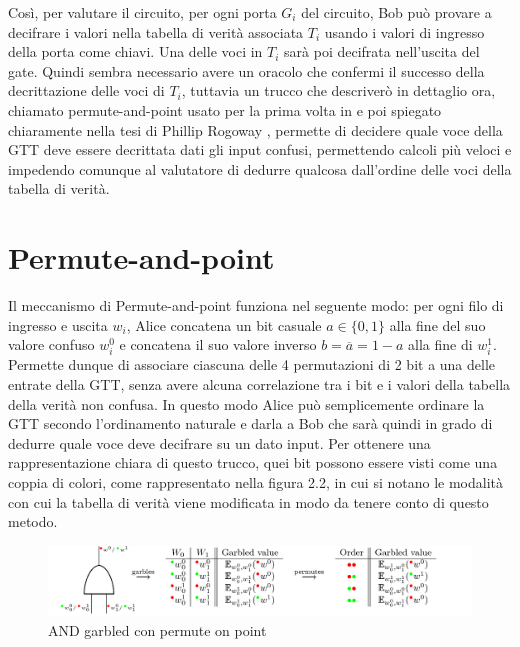 \documentclass[
  italian,
]{book}
\begin{document}
Così, per valutare il circuito, per ogni porta \(G_i\) del circuito, Bob può provare a decifrare i valori nella tabella di verità associata \(T_i\) usando i valori di ingresso della porta come chiavi. Una delle voci in \(T_i\) sarà poi decifrata nell'uscita del gate. Quindi sembra necessario avere un oracolo che confermi il successo della decrittazione delle voci di \(T_i\), tuttavia un trucco che descriverò in dettaglio ora, chiamato permute-and-point usato per la prima volta in \citep{fval} e poi spiegato chiaramente nella tesi di Phillip Rogoway \citep{prog}, permette di decidere quale voce della GTT deve essere decrittata dati gli input confusi, permettendo calcoli più veloci e impedendo comunque al valutatore di dedurre qualcosa dall'ordine delle voci della tabella di verità.

\hypertarget{permute-and-point}{%
\section{Permute-and-point}\label{permute-and-point}}

Il meccanismo di Permute-and-point funziona nel seguente modo: per ogni filo di ingresso e uscita \(w_i\), Alice concatena un bit casuale \(a \in \{0,1\}\) alla fine del suo valore confuso \(w^{0}_i\) e concatena il suo valore inverso \(b = \overline{a} = 1 - a\) alla fine di \(w^{1}_{i}\). Permette dunque di associare ciascuna delle 4 permutazioni di 2 bit a una delle entrate della GTT, senza avere alcuna correlazione tra i bit e i valori della tabella della verità non confusa. In questo modo Alice può semplicemente ordinare la GTT secondo l'ordinamento naturale e darla a Bob che sarà quindi in grado di dedurre quale voce deve decifrare su un dato input. Per ottenere una rappresentazione chiara di questo trucco, quei bit possono essere visti come una coppia di colori, come rappresentato nella figura 2.2, in cui si notano le modalità con cui la tabella di verità viene modificata in modo da tenere conto di questo metodo.

\newpage

\begin{figure}
\centering
\includegraphics{./media/02.png}
\caption{AND garbled con permute on point}
\end{figure}
\end{document}

